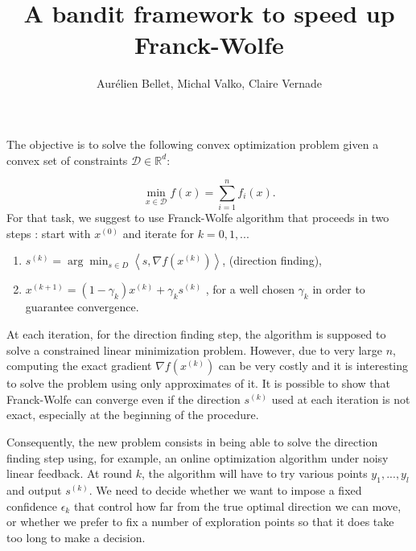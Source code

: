 \documentclass[english]{article}
\begin{document}
\title{A bandit framework to speed up Franck-Wolfe}


\author{Aurélien Bellet, Michal Valko, Claire Vernade}

\maketitle
The objective is to solve the following convex optimization problem
given a convex set of constraints $\mathcal{D}\in\mathbb{R}^{d}$:

\[
\min_{x\in\mathcal{D}}f(x)=\sum_{i=1}^{n}f_{i}(x).
\]
For that task, we suggest to use Franck-Wolfe algorithm that proceeds
in two steps : start with $x^{(0)}$ and iterate for $k=0,1,...$
\begin{enumerate}
\item $s^{(k)}=\arg\min_{s\in D}\left\langle s,\nabla f(x^{(k)})\right\rangle $,
(direction finding),
\item $x^{(k+1)}=(1-\gamma_{k})x^{(k)}+\gamma_{k}s^{(k)}$ , for a well
chosen $\gamma_{k}$ in order to guarantee convergence.
\end{enumerate}
At each iteration, for the direction finding step, the algorithm is
supposed to solve a constrained linear minimization problem. However,
due to very large $n$, computing the exact gradient $\nabla f(x^{(k)})$
can be very costly and it is interesting to solve the problem using
only approximates of it. It is possible to show that Franck-Wolfe
can converge even if the direction $s^{(k)}$ used at each iteration
is not exact, especially at the beginning of the procedure. 

Consequently, the new problem consists in being able to solve the
direction finding step using, for example, an online optimization
algorithm under noisy linear feedback. At round $k$, the algorithm will have to 
try various points $y_1,...,y_l$ and output $s^{(k)}$. We need to decide 
whether we want to impose a fixed confidence $\epsilon_k$ that control how far 
from the true optimal direction we can move, or whether we prefer to fix a 
number of exploration points so that it does take too long to make a decision. 
\end{document}
